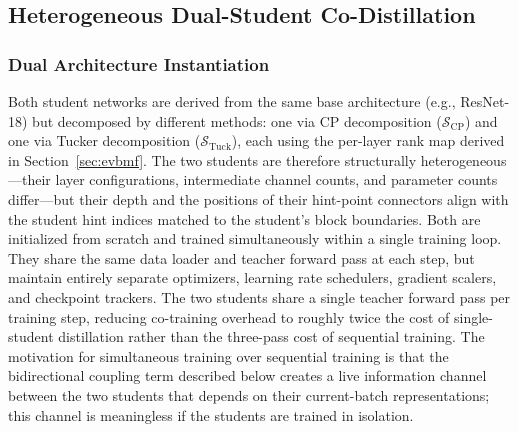 \documentclass[conference]{IEEEtran}
\begin{document}
\subsection{Heterogeneous Dual-Student Co-Distillation}
\label{sec:dual}

\subsubsection{Dual Architecture Instantiation}
\par
Both student networks are derived from the same base architecture
(e.g., ResNet-18) but decomposed by different methods: one via CP
decomposition ($\mathcal{S}_{\mathrm{CP}}$) and one via Tucker
decomposition ($\mathcal{S}_{\mathrm{Tuck}}$), each using the
per-layer rank map derived in Section~\ref{sec:evbmf}. The two
students are therefore structurally heterogeneous—their layer
configurations, intermediate channel counts, and parameter counts
differ—but their depth and the positions of their hint-point
connectors align with the student hint indices matched to the student's block boundaries. Both are initialized from scratch and trained
simultaneously within a single training loop. They share the same
data loader and teacher forward pass at each step, but maintain
entirely separate optimizers, learning rate schedulers, gradient
scalers, and checkpoint trackers. The two students share a single teacher forward pass per training step, reducing co-training overhead to roughly twice the cost of single-student
distillation rather than the three-pass cost of sequential training. The motivation for simultaneous
training over sequential training is that the bidirectional
coupling term described below creates a live information channel
between the two students that depends on their current-batch
representations; this channel is meaningless if the students are
trained in isolation.
\end{document}
